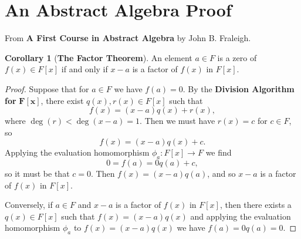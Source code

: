 \documentclass[12pt]{article}
\theoremstyle{definition}
\newtheorem{corollary}{Corollary}[section]
\begin{document}
\section{An Abstract Algebra Proof}
From \textbf{A First Course in Abstract Algebra} by John B. Fraleigh.
\begin{corollary}[\textbf{The Factor Theorem}]
An element $a \in F$ is a zero of $f(x) \in F[x]$ if and only if $x-a$ is a factor of $f(x)$ in $F[x]$.
\end{corollary}
\begin{proof}
Suppose that for $a \in F$ we have $f(a)=0$.  By the \textbf{Division Algorithm for} $\boldsymbol{F[x]}$, there exist $q(x),r(x) \in F[x]$ such that
\[
f(x)=(x-a)q(x)+r(x),
\]
where $\deg(r)<\deg(x-a)=1.$  Then we must have $r(x)=c$ for $c \in F$, so
\[
f(x)=(x-a)q(x)+c.
\]
Applying the evaluation homomorphism $\phi_{a}:F[x] \to F$ we find
\[
0=f(a)=0q(a)+c,
\]
so it must be that $c=0$.  Then $f(x)=(x-a)q(a)$, and so $x-a$ is a factor of $f(x)$ in $F[x]$.
\par
Conversely, if $a \in F$ and $x-a$ is a factor of $f(x)$ in $F[x]$, then there exists a $q(x) \in F[x]$ such that $f(x)=(x-a)q(x)$ and applying the evaluation homomorphism $\phi_{a}$ to
\linebreak
 $f(x)=(x-a)q(x)$ we have $f(a)=0q(a)=0$.
\end{proof}
\end{document}
